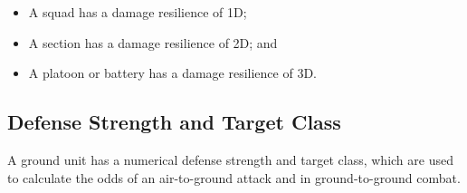 \documentclass[10pt]{article}
\begin{document}
\begin{itemize}
    \item A squad has a damage resilience of 1D;
    \item A section has a damage resilience of 2D; and
    \item A platoon or battery has a damage resilience of 3D.
\end{itemize}

\subsection{Defense Strength and Target Class}

A ground unit has a numerical defense strength and target class, which are used to calculate the odds of an air-to-ground attack and in ground-to-ground combat.
\end{document}
